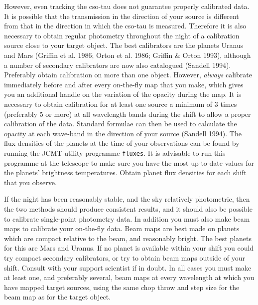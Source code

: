 \documentclass[11pt]{article}
\newcommand{\htmlref}[2]{#1}
\begin{document}
   However, even tracking the cso-tau does not guarantee properly
   calibrated data. It is possible that the transmission in the
   direction of your source is different from that in the direction in
   which the cso-tau is measured. Therefore it is also necessary to
   obtain regular photometry throughout the night of a calibration
   source close to your target object. The best calibrators are the
   planets Uranus and Mars
\htmlref{(Griffin et al. 1986;}{refer}
\htmlref{Orton et al. 1986;}{refer}
\htmlref{Griffin \& Orton 1993),}{refer}
   although a number of secondary calibrators are now also catalogued
\htmlref{(Sandell 1994).}{refer}
   Preferably obtain calibration on more than one object. However,
   {\em always\/} calibrate immediately before and after every
\htmlref{on-the-fly}{glossonthefly}
   map that you make, which gives you an additional handle on the
   variation of the opacity during the map. It is necessary to obtain
   calibration for
   at least one source a minimum of 3 times (preferably 5 or more) at
   all wavelength bands during the shift to allow a proper calibration
   of the data. Standard formulae can then be used to calculate the
   opacity at each wave-band in the direction of your source
\htmlref{(Sandell 1994).}{refer}
   The flux densities of the planets at the time of
   your observations can be
   found by running the JCMT utility programme {\tt fluxes}. It is
   advisable to run this programme at the telescope to make sure you
   have the most up-to-date values for the planets' brightness
   temperatures. Obtain planet flux densities for each shift that you
   observe.

   If the night has been reasonably stable, and the sky relatively
\htmlref{photometric,}{glossphotometric}
   then the two methods should produce consistent results, and it should
   also be possible to calibrate
\htmlref{single-point photometry}{glosssinglepoint}
   data. In addition you must also make
\htmlref{beam maps}{glossbeammap}
   to calibrate your on-the-fly data. Beam maps are best made on planets
   which are compact relative to the beam, and reasonably bright. The
   best planets for this are Mars and Uranus. If no planet is available
   within your shift you could try compact secondary calibrators, or try
   to obtain beam maps outside of your shift. Consult with your support
   scientist if in doubt. In all cases you must make at least one, and
   preferably several, beam maps at every wavelength at which you have
   mapped target sources, using the same
\htmlref{chop throw}{glosschopthrow}
   and step size for the beam map as for the target object.
\end{document}
